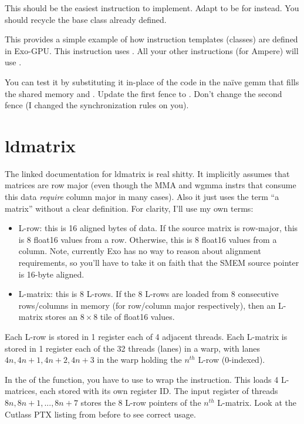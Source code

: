 This should be the easiest instruction to implement.
Adapt  to be for  instead.
You should recycle the  base class already defined.

This provides a simple example of how instruction templates (classes) are defined in Exo-GPU.
This instruction uses .
All your other instructions (for Ampere) will use .

You can test it by substituting it in-place of the code in the naïve gemm that fills the shared memory  and .
Update the first fence to .
Don't change the second fence (I changed the synchronization rules on you).

\section{ldmatrix}


The linked documentation for ldmatrix is real shitty.
It implicitly assumes that matrices are row major (even though the MMA and wgmma instrs that consume this data \emph{require} column major in many cases).
Also it just uses the term ``a matrix'' without a clear definition.
For clarity, I'll use my own terms:
\begin{itemize}
  \item L-row: this is 16 aligned bytes of data.
    If the source matrix is row-major, this is 8 float16 values from a row.
    Otherwise, this is 8 float16 values from a column.
    Note, currently Exo has no way to reason about alignment requirements, so you'll have to take it on faith that the SMEM source pointer is 16-byte aligned.
  \item L-matrix: this is 8 L-rows.
    If the 8 L-rows are loaded from 8 consecutive rows/columns in memory (for row/column major respectively), then an L-matrix stores an $8 \times 8$ tile of float16 values.
\end{itemize}
Each L-row is stored in 1 register each of 4 adjacent threads.
Each L-matrix is stored in 1 register each of the 32 threads (lanes) in a warp, with lanes $4n, 4n+1, 4n+2, 4n+3$ in the warp holding the $n^{th}$ L-row (0-indexed).

In the  of the function, you have to use  to wrap the  instruction.
This loads 4 L-matrices, each stored with its own register ID.
The input register of threads $8n, 8n + 1, ..., 8n + 7$ stores the 8 L-row pointers of the $n^{th}$ L-matrix.
Look at the Cutlass PTX listing from before to see correct usage.

